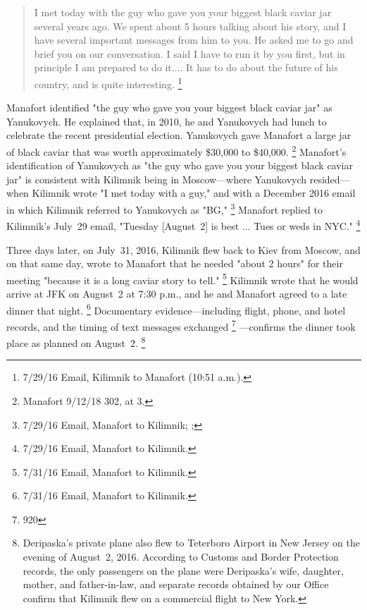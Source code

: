 \begin{quote}
I met today with the guy who gave you your biggest black caviar jar several years ago.
We spent about 5 hours talking about his story, and I have several important messages from him to you.
He asked me to go and brief you on our conversation.
I said I have to run it by you first, but in principle I am prepared to do it....
It has to do about the future of his country, and is quite interesting.%
\footnote{7/29/16 Email, Kilimnik to Manafort (10:51 a.m.).}
\end{quote}

Manafort identified "the guy who gave you your biggest black caviar jar" as Yanukovych.
He explained that, in 2010, he and Yanukovych had lunch to celebrate the recent presidential election.
Yanukovych gave Manafort a large jar of black caviar that was worth approximately \$30,000 to \$40,000.%
\footnote{Manafort 9/12/18 302, at 3.}
Manafort's identification of Yanukovych as "the guy who gave you your biggest black caviar jar" is consistent with Kilimnik being in Moscow---where Yanukovych resided---when Kilimnik wrote "I met today with a guy," and with a December 2016 email in which Kilimnik referred to Yanukovych as "BG,"
\footnote{7/29/16 Email, Manafort to Kilimnik; ; }
Manafort replied to Kilimnik's July~29 email, "Tuesday [August~2] is best ... Tues or weds in NYC."%
\footnote{7/29/16 Email, Manafort to Kilimnik.}

Three days later, on July~31, 2016, Kilimnik flew back to Kiev from Moscow, and on that same day, wrote to Manafort that he needed "about 2 hours" for their meeting "because it is a long caviar story to tell."%
\footnote{7/31/16 Email, Manafort to Kilimnik.}
Kilimnik wrote that he would arrive at JFK on August~2 at 7:30 p.m., and he and Manafort agreed to a late dinner that night.%
\footnote{7/31/16 Email, Manafort to Kilimnik.}
Documentary evidence---including flight, phone, and hotel records, and the timing of text messages exchanged%
\footnote{920}%
---confirms the dinner took place as planned on August~2.%
\footnote{Deripaska's private plane also flew to Teterboro Airport in New Jersey on the evening of August~2, 2016. According to Customs and Border Protection records, the only passengers on the plane were Deripaska's wife, daughter, mother, and father-in-law, and separate records obtained by our Office confirm that Kilimnik flew on a commercial flight to New York.}

